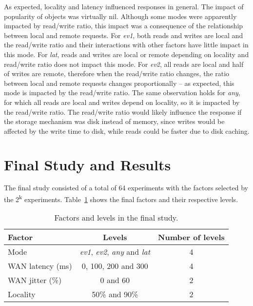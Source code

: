 \documentclass[man,floatsintext,12pt]{apa6}
\begin{document}
As expected, locality and latency influenced responses in general. The impact
of popularity of objects was virtually nil. Although some modes were apparently
impacted by read/write ratio, this impact was a consequence of the relationship
between local and remote requests. For \textit{ev1}, both reads and writes are
local and the read/write ratio and their interactions with other factors have
little impact in this mode. For \textit{lat}, reads and writes are local or
remote depending on locality and read/write ratio does not impact this mode.
For \textit{ev2}, all reads are local and half of writes are remote, therefore
when the read/write ratio changes, the ratio between local and remote requests
changes proportionally -- as expected, this mode is impacted by the read/write
ratio. The same observation holds for \textit{any}, for which all reads are
local and writes depend on locality, so it is impacted by the read/write ratio.
The read/write ratio would likely influence the response if the storage
mechanism was disk instead of memory, since writes would be affected by the
write time to disk, while reads could be faster due to disk caching.

\section{Final Study and Results}

The final study consisted of a total of 64 experiments with the factors
selected by the 2\textsuperscript{k} experiments.
Table~\ref{tab:fatores_e_niveis_do_estudo_final} shows the final factors and
their respective levels.

\begin{table}[h!]
\caption{Factors and levels in the final study.}
\begin{tabular}{lcc} \toprule

Factor & Levels & Number of levels\\ \midrule

Mode & \textit{ev1}, \textit{ev2}, \textit{any} and \textit{lat} & 4\\

WAN latency (ms) & 0, 100, 200 and 300 & 4\\

WAN jitter (\%) & 0 and 60 & 2\\

Locality & 50\% and 90\% & 2\\ \bottomrule

\end{tabular}

\label{tab:fatores_e_niveis_do_estudo_final}

\end{table}
\end{document}
